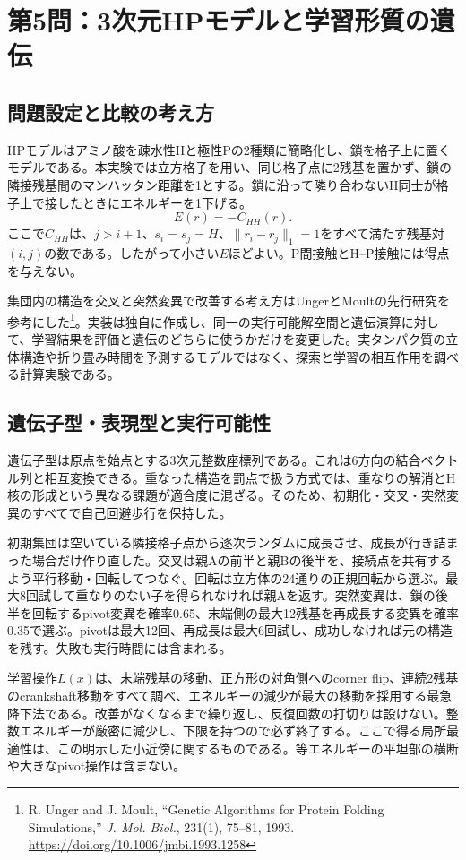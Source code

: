 \section{第5問：3次元HPモデルと学習形質の遺伝}
\label{sec:hp}

\subsection{問題設定と比較の考え方}
HPモデルはアミノ酸を疎水性Hと極性Pの2種類に簡略化し、鎖を格子上に置くモデルである。本実験では立方格子を用い、同じ格子点に2残基を置かず、鎖の隣接残基間のマンハッタン距離を1とする。鎖に沿って隣り合わないH同士が格子上で接したときにエネルギーを1下げる。
\begin{equation}
 E(r)=-C_{HH}(r).
\end{equation}
ここで$C_{HH}$は、$j>i+1$、$s_i=s_j=H$、$\|r_i-r_j\|_1=1$をすべて満たす残基対$(i,j)$の数である。したがって小さい$E$ほどよい。P間接触とH--P接触には得点を与えない。

集団内の構造を交叉と突然変異で改善する考え方はUngerとMoultの先行研究を参考にした\footnote{R. Unger and J. Moult, ``Genetic Algorithms for Protein Folding Simulations,'' \emph{J. Mol. Biol.}, 231(1), 75--81, 1993. \url{https://doi.org/10.1006/jmbi.1993.1258}}。実装は独自に作成し、同一の実行可能解空間と遺伝演算に対して、学習結果を評価と遺伝のどちらに使うかだけを変更した。実タンパク質の立体構造や折り畳み時間を予測するモデルではなく、探索と学習の相互作用を調べる計算実験である。

\subsection{遺伝子型・表現型と実行可能性}
遺伝子型は原点を始点とする3次元整数座標列である。これは6方向の結合ベクトル列と相互変換できる。重なった構造を罰点で扱う方式では、重なりの解消とH核の形成という異なる課題が適合度に混ざる。そのため、初期化・交叉・突然変異のすべてで自己回避歩行を保持した。

初期集団は空いている隣接格子点から逐次ランダムに成長させ、成長が行き詰まった場合だけ作り直した。交叉は親Aの前半と親Bの後半を、接続点を共有するよう平行移動・回転してつなぐ。回転は立方体の24通りの正規回転から選ぶ。最大8回試して重なりのない子を得られなければ親Aを返す。突然変異は、鎖の後半を回転するpivot変異を確率0.65、末端側の最大12残基を再成長する変異を確率0.35で選ぶ。pivotは最大12回、再成長は最大6回試し、成功しなければ元の構造を残す。失敗も実行時間には含まれる。

学習操作$L(x)$は、末端残基の移動、正方形の対角側へのcorner flip、連続2残基のcrankshaft移動をすべて調べ、エネルギーの減少が最大の移動を採用する最急降下法である。改善がなくなるまで繰り返し、反復回数の打切りは設けない。整数エネルギーが厳密に減少し、下限を持つので必ず終了する。ここで得る局所最適性は、この明示した小近傍に関するものである。等エネルギーの平坦部の横断や大きなpivot操作は含まない。

